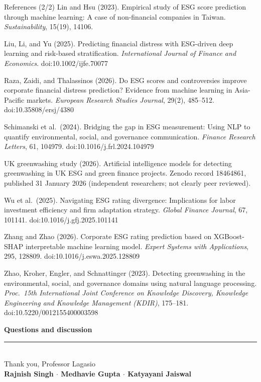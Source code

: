 \documentclass[aspectratio=169,11pt]{beamer}
\begin{document}
\begin{frame}[t]{References (2/2)}
\tiny
\setlength{\parskip}{3pt}
Lin and Hsu (2023). Empirical study of ESG score prediction through machine learning: A case of non-financial companies in Taiwan. \emph{Sustainability}, 15(19), 14106.

Liu, Li, and Yu (2025). Predicting financial distress with ESG-driven deep learning and risk-based stratification. \emph{International Journal of Finance and Economics}. doi:10.1002/ijfe.70077

Raza, Zaidi, and Thalassinos (2026). Do ESG scores and controversies improve corporate financial distress prediction? Evidence from machine learning in Asia-Pacific markets. \emph{European Research Studies Journal}, 29(2), 485--512. doi:10.35808/ersj/4380

Schimanski et al.\ (2024). Bridging the gap in ESG measurement: Using NLP to quantify environmental, social, and governance communication. \emph{Finance Research Letters}, 61, 104979. doi:10.1016/j.frl.2024.104979

UK greenwashing study (2026). Artificial intelligence models for detecting greenwashing in UK ESG and green finance projects. Zenodo record 18464861, published 31 January 2026 (independent researchers; not clearly peer reviewed).

Wu et al.\ (2025). Navigating ESG rating divergence: Implications for labor investment efficiency and firm adaptation strategy. \emph{Global Finance Journal}, 67, 101141. doi:10.1016/j.gfj.2025.101141

Zhang and Zhao (2026). Corporate ESG rating prediction based on XGBoost-SHAP interpretable machine learning model. \emph{Expert Systems with Applications}, 295, 128809. doi:10.1016/j.eswa.2025.128809

Zhao, Kroher, Engler, and Schnattinger (2023). Detecting greenwashing in the environmental, social, and governance domains using natural language processing. \emph{Proc.\ 15th International Joint Conference on Knowledge Discovery, Knowledge Engineering and Knowledge Management (KDIR)}, 175--181. doi:10.5220/0012155400003598
\end{frame}

\begin{frame}[plain]
\vspace{1.8cm}
\begin{center}
{\Huge\bfseries\color{navy}Questions and discussion}\\[10pt]
{\color{amber}\rule{6cm}{1.2pt}}\\[10pt]
{\Large Thank you, Professor Lagasio}\\[14pt]
{\normalsize\bfseries Rajnish Singh \;$\cdot$\; Medhavie Gupta \;$\cdot$\; Katyayani Jaiswal}
\end{center}
\end{frame}
\end{document}
